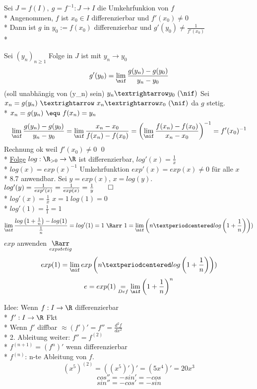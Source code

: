 Sei $J=f(I),\ g=f^{-1}:J→I$ die Umkehrfunkion von $f$\\*
Angenommen, $f$ ist $x_0\in I$ differenzierbar und $f'(x_0)≠0$\\*
Dann ist $g$ in $y_0:=f(x_0)$ differenzierbar und $g'(y_0)≠\frac{1}{f'(x_0)}$\\*
\bew
Sei $(y_n)_{n\geq 1}$ Folge in $J$ ist mit $y_n→y_0$
$$g'(y_0)=\lim_{\nif}\frac{g(y_n)-g(y_0)}{y_n-y_0}$$
\hfill(soll unabhängig von (y_n) sein)
$y_n→y_0\ (\nif)$ Sei $x_n=g(y_n)\ →\ x_n→x_0\ (\nif)$ da $g$ stetig.\\*
$x_n=g(y_n)\ \equ\ f(x_n)=y_n$\\
$$\lim_{\nif}\frac{g(y_n)-g(y_0)}{y_n-y_0}=\lim_{\nif}\frac{x_n-x_0}{f(x_n)-f(x_0)}=\left(\lim_{\nif}\frac{f(x_n)-f(x_0)}{x_n-x_0}\right)^{-1}=f'(x_0)^{-1}$$
Rechnung ok weil $f'(x_0)≠0$ \qed\\*
\ul{Folge} $log: \R_{>0}\to \R$ ist differenzierbar, $log'(x) = \frac{1}{x}$\\*
\bew
$log(x) = exp(x)^{-1}$ Umkehrfunktion $exp'(x) = exp(x) \neq 0$ für alle $x$\\*
\Rarr{} 8.7 anwendbar. Sei $y = exp(x)$, $x = log(y)$.
$log'(y) = \frac{1}{exp'(x)} = \frac{1}{exp(x)} = \frac{1}{y}\qed$\\*
$log'(x)=\frac{1}{x}$
$x=1\ log(1)=0$\\*
$log'(1)=\frac{1}{1}=1$
$$\lim_{\nif}\frac{log\left(1+\frac{1}{n}\right)-log(1)}{\frac{1}{n}}=log'(1)=1\ \Rarr\ 1=\lim_{\nif}\left(n·log\left(1+\frac{1}{n}\right)\right))$$
$exp$ anwenden $\underset{exp stetig}{\Rarr}$\\
$$exp(1)=\lim_{\nif}exp\left(n·log\left(1+\frac{1}{n}\right)\right))$$
$$e=exp(1)\underset{Def}{=}\lim_{\nif}\left(1+\frac{1}{n}\right)^n$$

Idee: Wenn $f: I \to \R$ differenzierbar\\*
\approx $f':I \to \R$ Fkt\\*
Wenn $f'$ diffbar $ \approx (f')' = f'' = \frac{d^2f}{dx^2}$\\*
2. Ableitung weiter:
$f'' = f^{(2)}$\\*
$f^{(n+1)} = (f^{n})'$ wenn differenzierbar\\*
$f^{(n)}$: n-te Ableitung von $f$.
\bsp
$$(x^5)^{(2)} = ((x^5)')' = (5x^4)' = 20x^3$$
$$cos'' = -sin' = -cos$$
$$sin'' = -cos' = -sin$$

